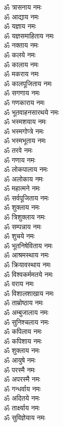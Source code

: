 \begin{multicols}{2}
\begin{flushleft}
ॐ त्रासनाय नमः\\
ॐ आद्याय नमः\\
ॐ यज्ञाय नमः\\
ॐ यज्ञसमाहिताय नमः\hfill{}\\
ॐ नक्ताय नमः\\
ॐ कलये नमः\\
ॐ कालाय नमः\\
ॐ मकराय नमः\\
ॐ कालपूजिताय नमः\\
ॐ सगणाय नमः\\
ॐ गणकाराय नमः\\
ॐ भूतवाहनसारथये नमः\\
ॐ भस्मशयाय नमः\\
ॐ भस्मगोप्त्रे नमः\hfill{}\\
ॐ भस्मभूताय नमः\\
ॐ तरवे नमः\\
ॐ गणाय नमः\\
ॐ लोकपालाय नमः\\
ॐ अलोकाय नमः\\
ॐ महात्मने नमः\\
ॐ सर्वपूजिताय नमः\\
ॐ शुक्लाय नमः\\
ॐ त्रिशुक्लाय नमः\\
ॐ सम्पन्नाय नमः\hfill{}\\
ॐ शुचये नमः\\
ॐ भूतनिषेविताय नमः\\
ॐ आश्रमस्थाय नमः\\
ॐ क्रियावस्थाय नमः\\
ॐ विश्वकर्ममतये नमः\\
ॐ वराय नमः\\
ॐ विशालशाखाय नमः\\
ॐ ताम्रोष्ठाय नमः\\
ॐ अम्बुजालाय नमः\\
ॐ सुनिश्चलाय नमः\hfill{}\\
ॐ कपिलाय नमः\\
ॐ कपिशाय नमः\\
ॐ शुक्लाय नमः\\
ॐ आयुषे नमः\\
ॐ परस्मै नमः\\
ॐ अपरस्मै नमः\\
ॐ गन्धर्वाय नमः\\
ॐ अदितये नमः\\
ॐ तार्क्ष्याय नमः\\
ॐ सुविज्ञेयाय नमः\hfill{}\\

\end{flushleft}
\end{multicols}
